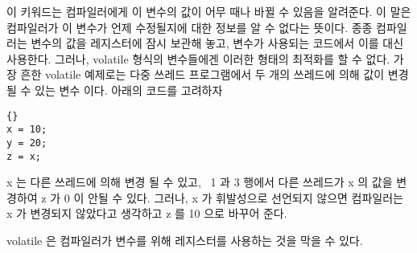 \begin{description}
이 키워드는 컴파일러에게 이 변수의 값이 어무 때나 바뀔 수 있음을 알려준다. 
이 말은 컴파일러가 이 변수가 언제 수정될지에 대한 정보를 알 수 없다는 
뜻이다. 종종 컴파일러는 변수의 값을 레지스터에 잠시 보관해 놓고, 변수가 
사용되는 코드에서 이를 대신 사용한다. 그러나, {\code volatile} 형식의 변수들에겐
이러한 형태의 최적화를 할 수 없다. 가장 흔한 volatile 예제로는 다중 쓰레드 프로그램에서
두 개의 쓰레드에 의해 값이 변경 될 수 있는 변수 이다. 아래의 코드를 고려하자
\begin{lstlisting}{}
x = 10;
y = 20;
z = x;
\end{lstlisting}

{\code x} 는 다른 쓰레드에 의해 변경 될 수 있고, ~1 과 3 행에서 다른 쓰레드가
{\code x} 의 값을 변경하여 {\code z} 가 0 이 안될 수 있다. 그러나, {\code x} 가
휘발성으로 선언되지 않으면 컴파일러는 {\code x} 가 변경되지 않았다고 생각하고
{\code z} 를 10 으로 바꾸어 준다. 

{\code volatile} 은 컴파일러가 변수를 위해 레지스터를 사용하는 것을
막을 수 있다. 

\end{description}
